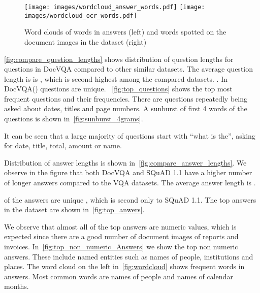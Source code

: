\documentclass[10pt,twocolumn,letterpaper]{article}
\newcommand{\datasetName}{DocVQA\xspace}
\newcommand{\squad}{SQuAD 1.1\xspace}
\begin{document}
\begin{figure}[b]
    \centering
    \texttt{[image: images/wordcloud\_answer\_words.pdf]}
    \texttt{[image: images/wordcloud\_ocr\_words.pdf]}
    \caption{Word clouds of words in answers (left) and words spotted on the document images in the dataset (right)}
    
    \label{fig:wordcloud}
    \vspace{-3mm}

\end{figure}


\autoref{fig:compare_question_lengths} shows distribution of question lengths for questions in \datasetName compared to other similar datasets.
The average question length is is , which is second highest among the compared datasets.
.
In \datasetName  () questions are unique. 
~\autoref{fig:top_questions} shows the top  most frequent questions and their frequencies. There are questions repeatedly being asked about dates, titles and page numbers. 
A sunburst of first 4 words of the questions is shown in~\autoref{fig:sunburst_4grams}.

It can be seen that a large majority of questions start with ``what is the'', asking for date, title, total, amount or name.

Distribution of answer lengths is shown in~\autoref{fig:compare_answer_lengths}. We observe in the figure that both \datasetName and \squad have a higher number of longer answers compared to the VQA datasets.
The average answer length is . 

 of the answers are unique , which is second only to \squad . The top  answers in the dataset are shown in~\autoref{fig:top_anwers}. 

We observe that almost all of the top answers are numeric values, which is expected since there are a good number of document images of reports and invoices. In~\autoref{fig:top_non_numeric_Answers} we show the top  non numeric answers. These include named entities such as names of people, institutions and places.
The word cloud on the left in~\autoref{fig:wordcloud} shows frequent words in answers. 
Most common words are names of people and names of calendar months.
\end{document}
